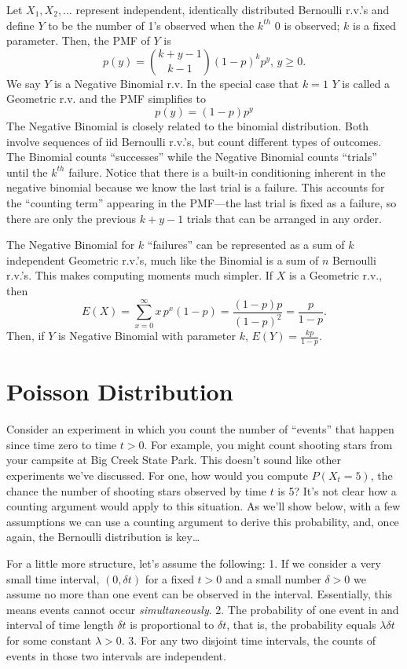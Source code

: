 \documentclass[
]{book}
\begin{document}
Let \(X_1, X_2, \ldots\) represent independent, identically distributed Bernoulli r.v.'s and define \(Y\) to be the number of 1's observed when the \(k^{th}\) 0 is observed; \(k\) is a fixed parameter. Then, the PMF of \(Y\) is
\[p(y) = {k + y - 1 \choose k-1}(1-p)^kp^{y}, \, y\geq 0.\]
We say \(Y\) is a Negative Binomial r.v. In the special case that \(k=1\) \(Y\) is called a Geometric r.v. and the PMF simplifies to
\[p(y) = (1-p)p^y\]
The Negative Binomial is closely related to the binomial distribution. Both involve sequences of iid Bernoulli r.v.'s, but count different types of outcomes. The Binomial counts ``successes'' while the Negative Binomial counts ``trials'' until the \(k^{th}\) failure. Notice that there is a built-in conditioning inherent in the negative binomial because we know the last trial is a failure. This accounts for the ``counting term'' appearing in the PMF---the last trial is fixed as a failure, so there are only the previous \(k+y - 1\) trials that can be arranged in any order.

The Negative Binomial for \(k\) ``failures'' can be represented as a sum of \(k\) independent Geometric r.v.'s, much like the Binomial is a sum of \(n\) Bernoulli r.v.'s. This makes computing moments much simpler. If \(X\) is a Geometric r.v., then
\[E(X) = \sum_{x=0}^\infty x \, p^x (1-p) = \frac{(1-p)p}{(1-p)^2} = \frac{p}{1-p}.\]
Then, if \(Y\) is Negative Binomial with parameter \(k\), \(E(Y) = \frac{kp}{1-p}\).

\hypertarget{poisson-distribution}{%
\section{Poisson Distribution}\label{poisson-distribution}}

Consider an experiment in which you count the number of ``events'' that happen since time zero to time \(t>0\). For example, you might count shooting stars from your campsite at Big Creek State Park. This doesn't sound like other experiments we've discussed. For one, how would you compute \(P(X_t = 5)\), the chance the number of shooting stars observed by time \(t\) is 5? It's not clear how a counting argument would apply to this situation. As we'll show below, with a few assumptions we can use a counting argument to derive this probability, and, once again, the Bernoulli distribution is key\ldots{}

For a little more structure, let's assume the following:
1. If we consider a very small time interval, \((0, \delta t)\) for a fixed \(t>0\) and a small number \(\delta>0\) we assume no more than one event can be observed in the interval. Essentially, this means events cannot occur \emph{simultaneously}.
2. The probability of one event in and interval of time length \(\delta t\) is proportional to \(\delta t\), that is, the probability equals \(\lambda \delta t\) for some constant \(\lambda >0\).
3. For any two disjoint time intervals, the counts of events in those two intervals are independent.
\end{document}

